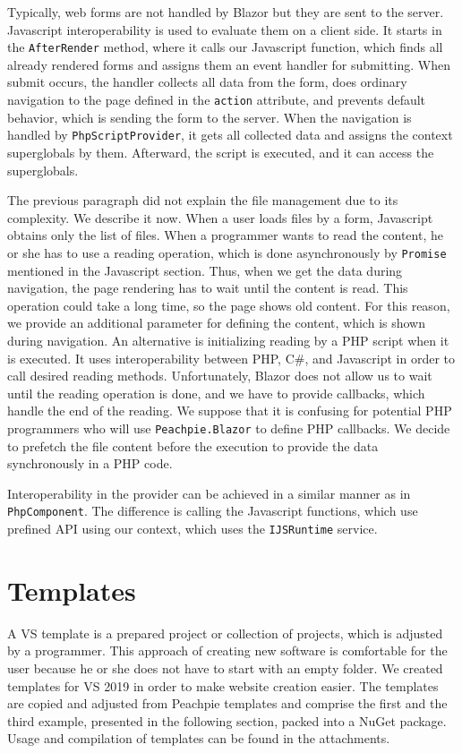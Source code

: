 Typically, web forms are not handled by Blazor but they are sent to the server.
Javascript interoperability is used to evaluate them on a client side.
It starts in the \texttt{AfterRender} method, where it calls our Javascript function, which finds all already rendered forms and assigns them an event handler for submitting.
When submit occurs, the handler collects all data from the form, does ordinary navigation to the page defined in the \texttt{action} attribute, and prevents default behavior, which is sending the form to the server.
When the navigation is handled by \texttt{PhpScriptProvider}, it gets all collected data and assigns the context superglobals by them.
Afterward, the script is executed, and it can access the superglobals.
\par
The previous paragraph did not explain the file management due to its complexity.
We describe it now.
When a user loads files by a form, Javascript obtains only the list of files. 
When a programmer wants to read the content, he or she has to use a reading operation, which is done asynchronously by \texttt{Promise} mentioned in the Javascript section.
Thus, when we get the data during navigation, the page rendering has to wait until the content is read.
This operation could take a long time, so the page shows old content.
For this reason, we provide an additional parameter for defining the content, which is shown during navigation.
An alternative is initializing reading by a PHP script when it is executed.
It uses interoperability between PHP, C\#, and Javascript in order to call desired reading methods.
Unfortunately, Blazor does not allow us to wait until the reading operation is done, and we have to provide callbacks, which handle the end of the reading.
We suppose that it is confusing for potential PHP programmers who will use \texttt{Peachpie.Blazor} to define PHP callbacks.
We decide to prefetch the file content before the execution to provide the data synchronously in a PHP code.
\par
Interoperability in the provider can be achieved in a similar manner as in \texttt{PhpComponent}.
The difference is calling the Javascript functions, which use prefined API using our context, which uses the \texttt{IJSRuntime} service.

\section{Templates}

A \ac{VS} template is a prepared project or collection of projects, which is adjusted by a programmer.
This approach of creating new software is comfortable for the user because he or she does not have to start with an empty folder.
We created templates for VS 2019 in order to make website creation easier.
The templates are copied and adjusted from Peachpie templates \cite{online:templates} and comprise the first and the third example, presented in the following section, packed into a NuGet package.
Usage and compilation of templates can be found in the attachments.
 